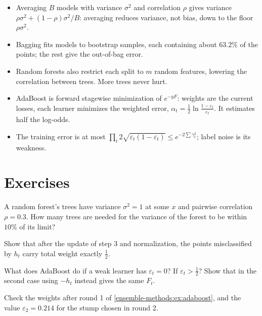 \begin{notechapter}
\begin{chaptersummary}
\begin{itemize}[nosep]
  \item Averaging $B$ models with variance $\sigma^2$ and correlation $\rho$ gives variance
        $\rho\sigma^2 + (1 - \rho)\sigma^2/B$: averaging reduces variance, not bias, down to the floor $\rho\sigma^2$.
  \item Bagging fits models to bootstrap samples, each containing about $63.2\%$ of the points;
        the rest give the out-of-bag error.
  \item Random forests also restrict each split to $m$ random features, lowering the
        correlation between trees. More trees never hurt.
  \item AdaBoost is forward stagewise minimization of $e^{-yF}$: weights are the current losses,
        each learner minimizes the weighted error, $\alpha_t = \frac12\ln\frac{1 - \varepsilon_t}{\varepsilon_t}$. It estimates half the
        log-odds.
  \item The training error is at most $\prod_t2\sqrt{\varepsilon_t(1 - \varepsilon_t)}\leq e^{-2\sum\gamma_t^2}$; label noise is its weakness.
\end{itemize}
\end{chaptersummary}

\section*{Exercises}

\begin{exercise}\label{ensemble-methods:exr:1}
A random forest's trees have variance $\sigma^2 = 1$ at some $x$ and pairwise correlation $\rho = 0.3$.
How many trees are needed for the variance of the forest to be within $10\%$ of its limit?
\end{exercise}

\begin{exercise}\label{ensemble-methods:exr:2}
Show that after the update of step 3 and normalization, the points misclassified by $h_t$
carry total weight exactly $\frac12$.
\end{exercise}

\begin{exercise}\label{ensemble-methods:exr:3}
What does AdaBoost do if a weak learner has $\varepsilon_t = 0$? If $\varepsilon_t>\frac12$? Show that in the second
case using $-h_t$ instead gives the same $F_t$.
\end{exercise}

\begin{exercise}\label{ensemble-methods:exr:4}
Check the weights after round 1 of \cref{ensemble-methods:ex:adaboost}, and the value
$\varepsilon_2 = 0.214$ for the stump chosen in round 2.
\end{exercise}
\end{notechapter}
